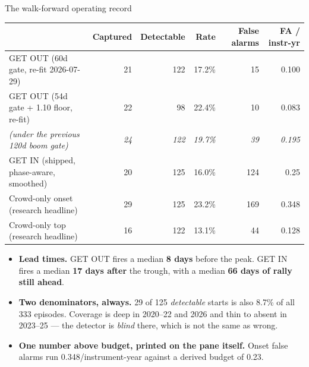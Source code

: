\documentclass[aspectratio=169,11pt]{beamer}
\begin{document}
\begin{frame}{The walk-forward operating record}
  \small
  \begin{table}
    \scriptsize
    \setlength{\tabcolsep}{4pt}
    \begin{tabular}{@{}lrrrrr@{}}
      \toprule
      & \textbf{Captured} & \textbf{Detectable} & \textbf{Rate}
      & \textbf{False alarms} & \textbf{FA / instr-yr} \\
      \midrule
      GET OUT (60d gate, re-fit 2026-07-29) & 21 & 122 & 17.2\% & 15 & 0.100 \\
      GET OUT (54d gate + 1.10 floor, re-fit) & 22 & 98 & 22.4\% & 10 & 0.083 \\
      \quad\emph{\scriptsize (under the previous 120d boom gate)} & \emph{\scriptsize 24} & \emph{\scriptsize 122} & \emph{\scriptsize 19.7\%} & \emph{\scriptsize 39} & \emph{\scriptsize 0.195} \\
      GET IN  (shipped, phase-aware, smoothed) & 20 & 125 & 16.0\% & 124 & 0.25 \\
      \addlinespace
      Crowd-only onset (research headline)     & 29 & 125 & 23.2\% & 169 & 0.348 \\
      Crowd-only top (research headline)       & 16 & 122 & 13.1\% & 44  & 0.128 \\
      \bottomrule
    \end{tabular}
  \end{table}
  \vspace{0.4em}
  \begin{itemize}\footnotesize
    \item \textbf{Lead times.} GET OUT fires a median \textbf{8 days} before
      the peak. GET IN fires a median \textbf{17 days after} the trough, with
      a median \textbf{66 days of rally still ahead}.
    \item \textbf{Two denominators, always.} 29 of 125 \emph{detectable}
      starts is also 8.7\% of all 333 episodes. Coverage is deep in
      2020--22 and 2026 and thin to absent in 2023--25 --- the detector is
      \emph{blind} there, which is not the same as wrong.
    \item \textbf{One number above budget, printed on the pane itself.} Onset
      false alarms run 0.348/instrument-year against a derived budget of 0.23.
  \end{itemize}
\end{frame}
\end{document}

